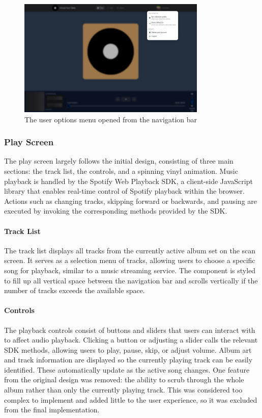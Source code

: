 \begin{figure} [H]
    \centering
    \includegraphics[width=0.8\textwidth]{figures/menu_open_screen.png}
    \caption{The user options menu opened from the navigation bar}
    \label{fig:user_options_menu}
\end{figure}

\subsubsection{Play Screen}
The play screen largely follows the initial design, consisting of three main sections: the track list, the controls, and a spinning vinyl animation. Music playback is handled by the Spotify Web Playback SDK, a client-side JavaScript library that enables real-time control of Spotify playback within the browser. Actions such as changing tracks, skipping forward or backwards, and pausing are executed by invoking the corresponding methods provided by the SDK.

\paragraph{Track List}
The track list displays all tracks from the currently active album set on the scan screen. It serves as a selection menu of tracks, allowing users to choose a specific song for playback, similar to a music streaming service. The component is styled to fill up all vertical space between the navigation bar and scrolls vertically if the number of tracks exceeds the available space.

\paragraph{Controls}
The playback controls consist of buttons and sliders that users can interact with to affect audio playback. Clicking a button or adjusting a slider calls the relevant SDK methods, allowing users to play, pause, skip, or adjust volume. Album art and track information are displayed so the currently playing track can be easily identified. These automatically update as the active song changes.
One feature from the original design was removed: the ability to scrub through the whole album rather than only the currently playing track. This was considered too complex to implement and added little to the user experience, so it was excluded from the final implementation.

